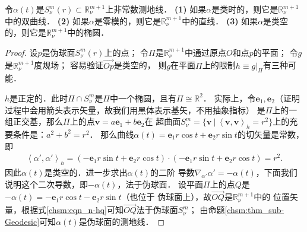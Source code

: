 \begin{proposition}
    令$\alpha(t)$是$S^m_\nu(r) \subset \mathbb{R}^{m+1}_\nu$上非常数测地线．
    {\bfseries (1)} 如果$\alpha$是类时的，则它是$\mathbb{R}^{m+1}_\nu$中的双曲线．    
    {\bfseries (2)} 如果$\alpha$是零模的，则它是$\mathbb{R}^{m+1}_\nu$中的直线．    
    {\bfseries (3)} 如果$\alpha$是类空的，则它是$\mathbb{R}^{m+1}_\nu$中的椭圆．
\end{proposition}

\begin{proof}
    设$p$是伪球面$S^m_\nu(r)$上的点；
    令$\Pi$是$\mathbb{R}^{m+1}_\nu$中通过原点$O$和点$p$的平面；
    令$g$是$\mathbb{R}^{m+1}_\nu$度规场；
    容易验证$\overrightarrow{Op}$是类空的，
    则$g$在平面$\Pi$上的限制$h\equiv g|_\Pi$有三种可能．
    
     $h$是正定的．此时$\Pi \cap S^m_\nu$是$\Pi$中一个椭圆，且有$\Pi \cong \mathbb{R}^{2}$．
    实际上，令$\boldsymbol{e}_1,\boldsymbol{e}_2$（证明过程中会用箭头表示矢量，故我们用黑体表示基矢，不用抽象指标）
    是$\Pi$上的一组正交基，那么$\Pi$上的点$\boldsymbol{v}=a\boldsymbol{e}_1+b\boldsymbol{e}_2$在
    超曲面$S^m_\nu=\{\boldsymbol{v} \ | \  \left<\boldsymbol{v} ,\boldsymbol{v}\right>_h = r^2 \}$上的充要条件是：$a^2+b^2=r^2$．
    那么曲线$\alpha(t)= \boldsymbol{e}_1 r \cos t +\boldsymbol{e}_2 r \sin t $的切矢量是常数，即
    \begin{align*}
        \left<\alpha', \alpha'\right>_h
        =\left( -\boldsymbol{e}_1 r \sin t +\boldsymbol{e}_2 r \cos t \right) \cdot 
         \left( -\boldsymbol{e}_1 r \sin t +\boldsymbol{e}_2 r \cos t \right)
        = r^2 .
    \end{align*}
    因此$\alpha(t)$是类空的．进一步求出$\alpha(t)$的二阶
    导数$\nabla_{\alpha'}\alpha' =-\alpha(t)$，下面我们说明这个二次导数，即$-\alpha(t)$，法于伪球面．
    设平面$\Pi$上的点$Q$是$-\alpha(t)= -\boldsymbol{e}_1 r \cos t -\boldsymbol{e}_2 r \sin t $（也位于
    伪球面上），故$\overrightarrow{OQ}$是$\mathbb{R}^{m+1}_\nu$中的
    位置矢量，根据式\eqref{chsm:eqn_n-hq}可知$\overrightarrow{OQ}$法于伪球面$S^m_\nu$；
    由命题\ref{chsm:thm_sub-Geodesic}可知$\alpha(t)$是伪球面的测地线．
    

\end{proof}
